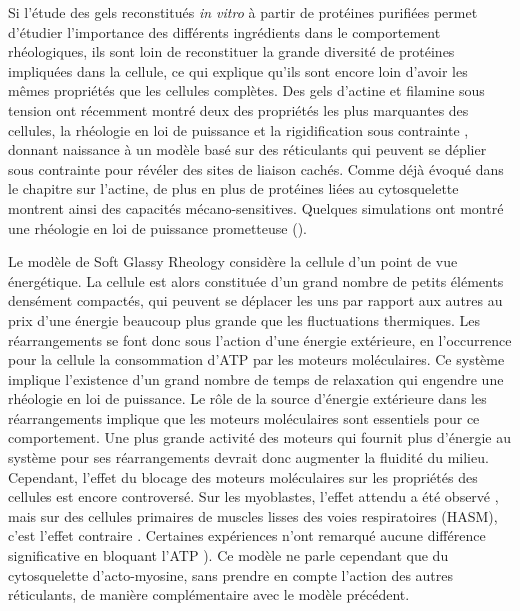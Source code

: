 Si l'étude des gels reconstitués \textit{in vitro} à partir de protéines purifiées permet d'étudier l'importance des différents ingrédients dans le comportement rhéologiques, ils sont loin de reconstituer la grande diversité de protéines impliquées dans la cellule, ce qui explique qu'ils sont encore loin d'avoir les mêmes propriétés que les cellules complètes. 
Des gels d'actine et filamine sous tension ont récemment montré deux des propriétés les plus marquantes des cellules, la rhéologie en loi de puissance et la rigidification sous contrainte \cite{gardel_stress-dependent_2006}, donnant naissance à un modèle basé sur des réticulants qui peuvent se déplier sous contrainte pour révéler des sites de liaison cachés. Comme déjà évoqué dans le chapitre sur l'actine, de plus en plus de protéines liées au cytosquelette montrent ainsi des capacités mécano-sensitives. Quelques simulations ont montré une rhéologie en loi de puissance prometteuse (\cite{hoffman_fragility_2007}). 

Le modèle de Soft Glassy Rheology \parencite{sollich_rheological_1998} considère la cellule d'un point de vue énergétique. 
La cellule est alors constituée d'un grand nombre de petits éléments densément compactés, qui peuvent se déplacer les uns par rapport aux autres au prix d'une énergie beaucoup plus grande que les fluctuations thermiques. 
Les réarrangements se font donc sous l'action d'une énergie extérieure, en l'occurrence pour la cellule la consommation d'ATP par les moteurs moléculaires. 
Ce système implique l'existence d'un grand nombre de temps de relaxation qui engendre une rhéologie en loi de puissance. 
Le rôle de la source d'énergie extérieure dans les réarrangements implique que les moteurs moléculaires sont essentiels pour ce comportement. Une plus grande activité des moteurs qui fournit plus d'énergie au système pour ses réarrangements devrait donc augmenter la fluidité du milieu. 
Cependant, l'effet du blocage des moteurs moléculaires sur les propriétés des cellules est encore controversé. Sur les myoblastes, l'effet attendu a été observé \parencite{balland_dissipative_2005}, mais sur des cellules primaires de muscles lisses des voies respiratoires (HASM), c'est l'effet contraire \parencite{fabry_signal_2001}. Certaines expériences n'ont remarqué aucune différence significative en bloquant l'ATP \parencite{hoffman_consensus_2006}). 
Ce modèle ne parle cependant que du cytosquelette d'acto-myosine, sans prendre en compte l'action des autres réticulants, de manière complémentaire avec le modèle précédent. 


